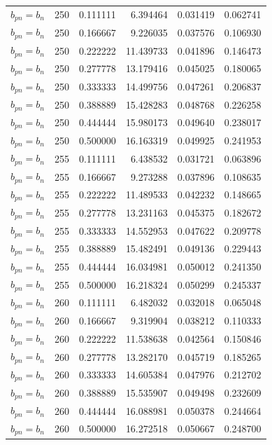 \begin{longtable}{l r r r r r}
$b_{pn} = b_n$ & 250 & 0.111111 & 6.394464 & 0.031419 & 0.062741 \\
$b_{pn} = b_n$ & 250 & 0.166667 & 9.226035 & 0.037576 & 0.106930 \\
$b_{pn} = b_n$ & 250 & 0.222222 & 11.439733 & 0.041896 & 0.146473 \\
$b_{pn} = b_n$ & 250 & 0.277778 & 13.179416 & 0.045025 & 0.180065 \\
$b_{pn} = b_n$ & 250 & 0.333333 & 14.499756 & 0.047261 & 0.206837 \\
$b_{pn} = b_n$ & 250 & 0.388889 & 15.428283 & 0.048768 & 0.226258 \\
$b_{pn} = b_n$ & 250 & 0.444444 & 15.980173 & 0.049640 & 0.238017 \\
$b_{pn} = b_n$ & 250 & 0.500000 & 16.163319 & 0.049925 & 0.241953 \\
$b_{pn} = b_n$ & 255 & 0.111111 & 6.438532 & 0.031721 & 0.063896 \\
$b_{pn} = b_n$ & 255 & 0.166667 & 9.273288 & 0.037896 & 0.108635 \\
$b_{pn} = b_n$ & 255 & 0.222222 & 11.489533 & 0.042232 & 0.148665 \\
$b_{pn} = b_n$ & 255 & 0.277778 & 13.231163 & 0.045375 & 0.182672 \\
$b_{pn} = b_n$ & 255 & 0.333333 & 14.552953 & 0.047622 & 0.209778 \\
$b_{pn} = b_n$ & 255 & 0.388889 & 15.482491 & 0.049136 & 0.229443 \\
$b_{pn} = b_n$ & 255 & 0.444444 & 16.034981 & 0.050012 & 0.241350 \\
$b_{pn} = b_n$ & 255 & 0.500000 & 16.218324 & 0.050299 & 0.245337 \\
$b_{pn} = b_n$ & 260 & 0.111111 & 6.482032 & 0.032018 & 0.065048 \\
$b_{pn} = b_n$ & 260 & 0.166667 & 9.319904 & 0.038212 & 0.110333 \\
$b_{pn} = b_n$ & 260 & 0.222222 & 11.538638 & 0.042564 & 0.150846 \\
$b_{pn} = b_n$ & 260 & 0.277778 & 13.282170 & 0.045719 & 0.185265 \\
$b_{pn} = b_n$ & 260 & 0.333333 & 14.605384 & 0.047976 & 0.212702 \\
$b_{pn} = b_n$ & 260 & 0.388889 & 15.535907 & 0.049498 & 0.232609 \\
$b_{pn} = b_n$ & 260 & 0.444444 & 16.088981 & 0.050378 & 0.244664 \\
$b_{pn} = b_n$ & 260 & 0.500000 & 16.272518 & 0.050667 & 0.248700 \\

\end{longtable}
